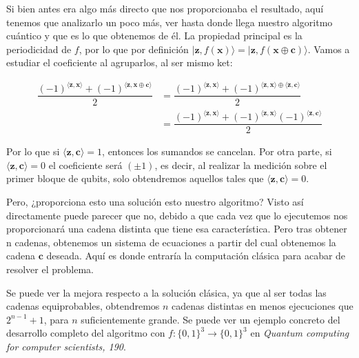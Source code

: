  Si bien antes era algo más directo que nos proporcionaba el resultado, aquí tenemos que analizarlo un poco más, ver hasta donde llega nuestro algoritmo cuántico y que es lo que obtenemos de él. La propiedad principal es la periodicidad de $f$, por lo que por definición  $|\mathbf{z},f(\mathbf{x})\rangle=|\mathbf{z},f(\mathbf{x}\oplus \mathbf{c})\rangle$. Vamos a estudiar el coeficiente al agruparlos, al ser mismo ket:

 \begin{equation}
    \begin{split}
     \dfrac{(-1)^{\langle \mathbf{z},\mathbf{x}\rangle}+(-1)^{\langle \mathbf{z},\mathbf{x}\oplus \mathbf{c}\rangle}}{2} &= \dfrac{(-1)^{\langle \mathbf{z},\mathbf{x}\rangle}+(-1)^{\langle \mathbf{z},\mathbf{x}\rangle \oplus \langle \mathbf{z}, \mathbf{c}\rangle}}{2} \\ &= \dfrac{(-1)^{\langle \mathbf{z},\mathbf{x}\rangle}+(-1)^{\langle \mathbf{z},\mathbf{x}\rangle}(-1)^{\langle \mathbf{z}, \mathbf{c}\rangle}}{2}
    \end{split}
 \end{equation}

 Por lo que si $\langle \mathbf{z}, \mathbf{c}\rangle=1$, entonces los sumandos se cancelan. Por otra parte, si $\langle \mathbf{z}, \mathbf{c}\rangle=0$ el coeficiente será $(\pm 1)$, es decir, al realizar la medición sobre el primer bloque de qubits, solo obtendremos aquellos tales que $\langle \mathbf{z}, \mathbf{c}\rangle=0$.

 \vspace{14pt}

 Pero, ¿proporciona esto una solución esto nuestro algoritmo? Visto así directamente puede parecer que no, debido a que cada vez que lo ejecutemos nos proporcionará una cadena distinta que tiene esa característica. Pero tras obtener n cadenas, obtenemos un sistema de ecuaciones a partir del cual obtenemos la cadena $\mathbf{c}$ deseada. Aquí es donde entraría la computación clásica para acabar de resolver el problema.

 \vspace{14pt}

 Se puede ver la mejora respecto a la solución clásica, ya que al ser todas las cadenas equiprobables, obtendremos $n$ cadenas distintas en menos ejecuciones que $2^{n-1}+1$, para $n$ suficientemente grande. Se puede ver un ejemplo concreto del desarrollo completo del algoritmo con $f:\{0,1\}^{3} \rightarrow\{0,1\}^{3}$ en \textit{Quantum computing for computer scientists, 190}\cite{B:QuantumScientist:2008}.

